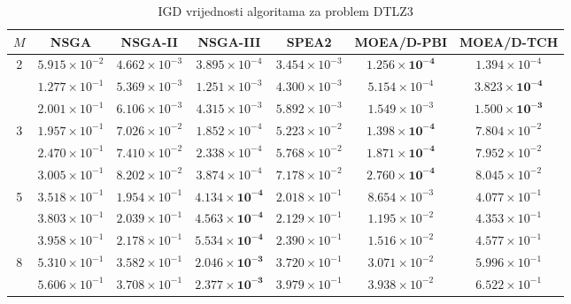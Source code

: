 \documentclass[times, utf8, zavrsni, numeric]{fer}
\begin{document}
\begin{table}[htb]
\caption{IGD vrijednosti algoritama za problem DTLZ3}
\label{tbl:dtlz3}
\centering
\small
\begin{tabular}{c|c|c|c|c|c|c} \hline
$M$ & NSGA & NSGA-II & NSGA-III & SPEA2 & MOEA/D-PBI & MOEA/D-TCH  \\ \hline
\multirow{3}{*}{2}  & $5.915\times 10^{-2}$    & $4.662\times 10^{-3}$ & $3.895\times 10^{-4}$ & $3.454\times 10^{-3}$ & $\mathbf{1.256\times 10^{-4}}$ &  $1.394\times 10^{-4}$\\
			        & $1.277\times 10^{-1}$    & $5.369\times 10^{-3}$ & $1.251\times 10^{-3}$ & $4.300\times 10^{-3}$ & $5.154\times 10^{-4}$ & $\mathbf{3.823\times 10^{-4}}$\\
                    & $2.001\times 10^{-1}$    & $6.106\times 10^{-3}$ & $4.315\times 10^{-3}$ & $5.892\times 10^{-3}$ & $1.549\times 10^{-3}$ & $\mathbf{1.500\times 10^{-3}}$\\ \hline
\multirow{3}{*}{3}  & $1.957\times 10^{-1}$    & $7.026\times 10^{-2}$ & $1.852\times 10^{-4}$ & $5.223\times 10^{-2}$ & $\mathbf{1.398\times 10^{-4}}$ & $7.804\times 10^{-2}$\\
			        & $2.470\times 10^{-1}$    & $7.410\times 10^{-2}$ & $2.338\times 10^{-4}$ & $5.768\times 10^{-2}$ & $\mathbf{1.871\times 10^{-4}}$ & $7.952\times 10^{-2}$\\
                    & $3.005\times 10^{-1}$    & $8.202\times 10^{-2}$ & $3.874\times 10^{-4}$ & $7.178\times 10^{-2}$ & $\mathbf{2.760\times 10^{-4}}$ & $8.045\times 10^{-2}$\\ \hline
\multirow{3}{*}{5}  & $3.518\times 10^{-1}$    & $1.954\times 10^{-1}$ & $\mathbf{4.134\times 10^{-4}}$ & $2.018\times 10^{-1}$ & $8.654\times 10^{-3}$ & $4.077\times 10^{-1}$\\
			        & $3.803\times 10^{-1}$    & $2.039\times 10^{-1}$ & $\mathbf{4.563\times 10^{-4}}$ & $2.129\times 10^{-1}$ & $1.195\times 10^{-2}$ & $4.353\times 10^{-1}$\\
                    & $3.958\times 10^{-1}$    & $2.178\times 10^{-1}$ & $\mathbf{5.534\times 10^{-4}}$ & $2.390\times 10^{-1}$ & $1.516\times 10^{-2}$ & $4.577\times 10^{-1}$\\ \hline
\multirow{3}{*}{8}  & $5.310\times 10^{-1}$    & $3.582\times 10^{-1}$ & $\mathbf{2.046\times 10^{-3}}$ & $3.720\times 10^{-1}$ & $3.071\times 10^{-2}$ & $5.996\times 10^{-1}$\\
			        & $5.606\times 10^{-1}$    & $3.708\times 10^{-1}$ & $\mathbf{2.377\times 10^{-3}}$ & $3.979\times 10^{-1}$ & $3.938\times 10^{-2}$ & $6.522\times 10^{-1}$\\

\end{tabular}
\end{table}
\end{document}
